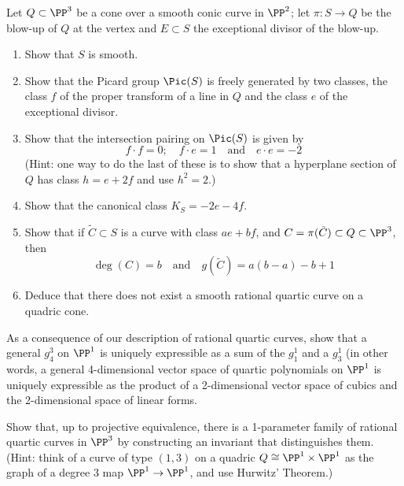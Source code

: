 \begin{exercise}\label{F2}
Let $Q \subset \PP^3$ be a cone over a smooth conic curve in $\PP^2$; let $\pi : S \to Q$ be the blow-up of $Q$ at the vertex and $E \subset S$ the exceptional divisor of the blow-up.
\begin{enumerate}
\item Show that $S$ is smooth.
\item Show that the Picard group $\Pic(S)$ is freely generated by two classes, the class $f$ of the proper transform of a line in $Q$ and the class $e$ of the exceptional divisor.
\item\label{intersections on a quadric} Show that the intersection pairing on $\Pic(S)$ is given by
$$
f \cdot f = 0; \quad f \cdot e = 1 \quad \text{and} \quad e \cdot e = -2
$$
(Hint: one way to do the last of these is to show that a hyperplane section of $Q$ has class $h = e + 2f$ and use $h^2 = 2$.)
\item Show that the canonical class $K_S = -2e-4f$.
\item Show that if $\tilde C \subset S$ is a curve with class $ae + bf$, and
$C = \pi(\tilde C) \subset Q \subset \PP^3$, then
$$
\deg(C) = b \quad \text{and} \quad g(\tilde C) = a(b-a) -b +1
$$
\item Deduce that there does not exist a smooth rational quartic curve on a quadric cone.
\end{enumerate}
\end{exercise}

\begin{exercise}
As a consequence of our description of rational quartic curves, show that a general $g^3_4$ on $\PP^1$ is uniquely expressible as a sum of the $g_1^1$ and a $g^1_3$
(in other words, a general 4-dimensional vector space of quartic polynomials on $\PP^1$ is uniquely expressible as the product of a 2-dimensional vector space of cubics and the 2-dimensional space of linear forms.
\end{exercise}

\begin{exercise}
Show that, up to projective equivalence, there is a 1-parameter family of rational quartic curves in $\PP^3$ 
by constructing an invariant that distinguishes them. (Hint: think of a curve of type $(1,3)$ on a quadric $Q \cong \PP^1 \times \PP^1$ as  the graph of a degree 3 map $\PP^1 \to \PP^1$, and use Hurwitz' Theorem.)
\end{exercise}






